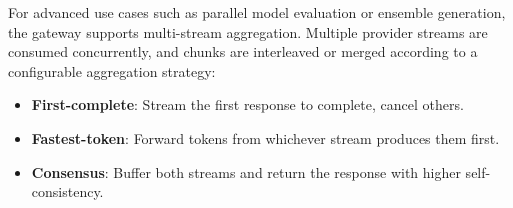 For advanced use cases such as parallel model evaluation or ensemble generation, the gateway supports multi-stream aggregation. Multiple provider streams are consumed concurrently, and chunks are interleaved or merged according to a configurable aggregation strategy:

\begin{itemize}[leftmargin=*]
    \item \textbf{First-complete}: Stream the first response to complete, cancel others.
    \item \textbf{Fastest-token}: Forward tokens from whichever stream produces them first.
    \item \textbf{Consensus}: Buffer both streams and return the response with higher self-consistency.
\end{itemize}

